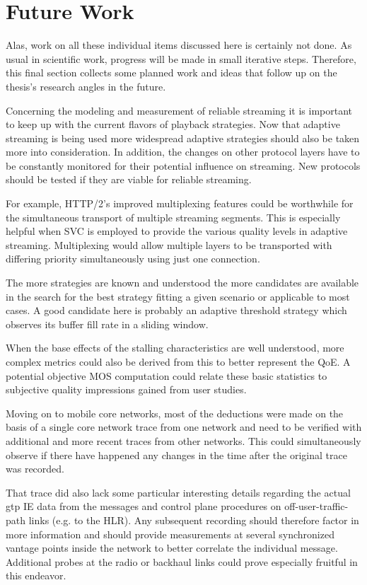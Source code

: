 \section{Future Work}

Alas, work on all these individual items discussed here is certainly not done. As usual in scientific work, progress will be made in small iterative steps. Therefore, this final section collects some planned work and ideas that follow up on the thesis's research angles in the future.

Concerning the modeling and measurement of reliable streaming it is important to keep up with the current flavors of playback strategies. Now that adaptive streaming is being used more widespread adaptive strategies should also be taken more into consideration. In addition, the changes on other protocol layers have to be constantly monitored for their potential influence on streaming. New protocols should be tested if they are viable for reliable streaming. 

For example, \gls{HTTP}/2's improved multiplexing features could be worthwhile for the simultaneous transport of multiple streaming segments. This is especially helpful when \gls{SVC} is employed to provide the various quality levels in adaptive streaming. Multiplexing would allow multiple layers to be transported with differing priority simultaneously using just one connection.

The more strategies are known and understood the more candidates are available in the search for the best strategy fitting a given scenario or applicable to most cases. A good candidate here is probably an adaptive threshold strategy which observes its buffer fill rate in a sliding window.

When the base effects of the stalling characteristics are well understood, more complex metrics could also be derived from this to better represent the \gls{QoE}. A potential objective \gls{MOS} computation could relate these basic statistics to subjective quality impressions gained from user studies.

Moving on to mobile core networks, most of the deductions were made on the basis of a single core network trace from one network and need to be verified with additional and more recent traces from other networks. This could simultaneously observe if there have happened any changes in the time after the original trace was recorded.

That trace did also lack some particular interesting details regarding the actual \gls{gtp} \gls{IE} data from the messages and control plane procedures on off-user-traffic-path links (e.g. to the \gls{HLR}). Any subsequent recording should therefore factor in more information and should provide measurements at several synchronized vantage points inside the network to better correlate the individual message. Additional probes at the radio or backhaul links could prove especially fruitful in this endeavor. 

